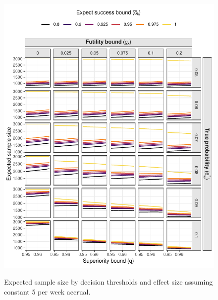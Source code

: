 \documentclass{article}
\begin{document}
\begin{figure}[!ht]
	\caption{Expected sample size by decision thresholds and effect size assuming constant 5 per week accrual.}
	\includegraphics{figures/expected_ss_5.pdf}
	\label{fig:expected_ss_5}
\end{figure}
\end{document}

